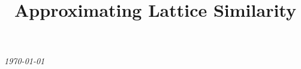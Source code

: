 \documentclass[preprint]{iucr}              %
\numberwithin{equation}{section}
\numberwithin{equation}{section}
\begin{document}
	
	
	
	
	
	
	
	
	
	
	
	{\LARGE \emph{\today}} \\
	\title{Approximating Lattice Similarity}
	
	
\end{document}
